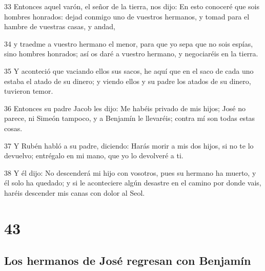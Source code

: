 \par 33 Entonces aquel varón, el señor de la tierra, nos dijo: En esto conoceré que sois hombres honrados: dejad conmigo uno de vuestros hermanos, y tomad para el hambre de vuestras casas, y andad,
\par 34 y traedme a vuestro hermano el menor, para que yo sepa que no sois espías, sino hombres honrados; así os daré a vuestro hermano, y negociaréis en la tierra.
\par 35 Y aconteció que vaciando ellos sus sacos, he aquí que en el saco de cada uno estaba el atado de su dinero; y viendo ellos y su padre los atados de su dinero, tuvieron temor.
\par 36 Entonces su padre Jacob les dijo: Me habéis privado de mis hijos; José no parece, ni Simeón tampoco, y a Benjamín le llevaréis; contra mí son todas estas cosas.
\par 37 Y Rubén habló a su padre, diciendo: Harás morir a mis dos hijos, si no te lo devuelvo; entrégalo en mi mano, que yo lo devolveré a ti.
\par 38 Y él dijo: No descenderá mi hijo con vosotros, pues su hermano ha muerto, y él solo ha quedado; y si le aconteciere algún desastre en el camino por donde vais, haréis descender mis canas con dolor al Seol.

\chapter{43}

\section*{Los hermanos de José regresan con Benjamín}

